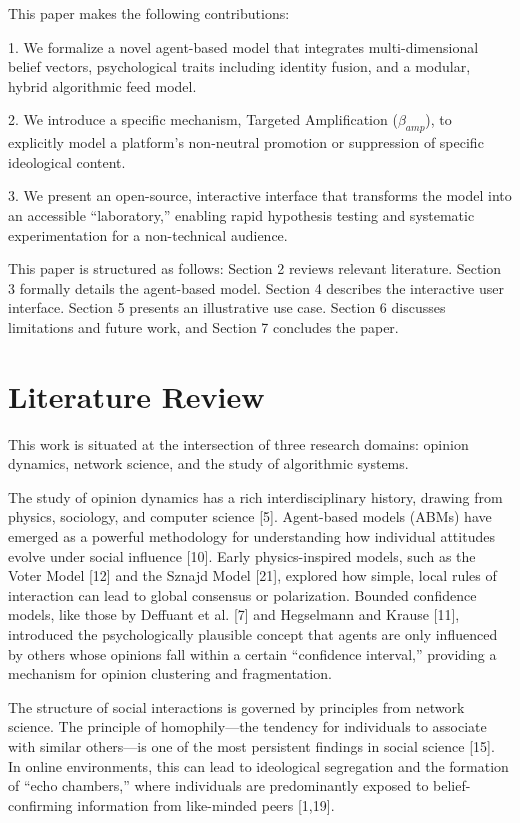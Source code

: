 \documentclass[11pt]{article}
\begin{document}
This paper makes the following contributions:

1. We formalize a novel agent-based model that integrates multi-dimensional belief vectors, psychological traits including identity fusion, and a modular, hybrid algorithmic feed model.

2. We introduce a specific mechanism, Targeted Amplification ($\beta_{amp}$), to explicitly model a platform’s non-neutral promotion or suppression of specific ideological content.

3. We present an open-source, interactive interface that transforms the model into an accessible ``laboratory,'' enabling rapid hypothesis testing and systematic experimentation for a non-technical audience.

This paper is structured as follows: Section 2 reviews relevant literature. Section 3 formally details the agent-based model. Section 4 describes the interactive user interface. Section 5 presents an illustrative use case. Section 6 discusses limitations and future work, and Section 7 concludes the paper.

\section{Literature Review}

This work is situated at the intersection of three research domains: opinion dynamics, network science, and the study of algorithmic systems.

The study of opinion dynamics has a rich interdisciplinary history, drawing from physics, sociology, and computer science [5]. Agent-based models (ABMs) have emerged as a powerful methodology for understanding how individual attitudes evolve under social influence [10]. Early physics-inspired models, such as the Voter Model [12] and the Sznajd Model [21], explored how simple, local rules of interaction can lead to global consensus or polarization. Bounded confidence models, like those by Deffuant et al. [7] and Hegselmann and Krause [11], introduced the psychologically plausible concept that agents are only influenced by others whose opinions fall within a certain ``confidence interval,'' providing a mechanism for opinion clustering and fragmentation.

The structure of social interactions is governed by principles from network science. The principle of homophily—the tendency for individuals to associate with similar others—is one of the most persistent findings in social science [15]. In online environments, this can lead to ideological segregation and the formation of ``echo chambers,'' where individuals are predominantly exposed to belief-confirming information from like-minded peers [1,19].
\end{document}

